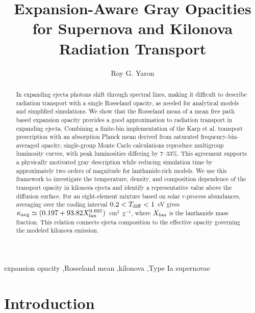 \documentclass[final,5p,times,twocolumn]{elsarticle}
\begin{document}
\begin{frontmatter}

\author[1]{Roy G. Yaron}

\title{Expansion-Aware Gray Opacities for Supernova and Kilonova Radiation Transport}

\begin{abstract}
    In expanding ejecta photons shift through spectral lines, making it difficult to describe radiation transport 
    with a single Rosseland opacity, as needed for analytical models and simplified simulations.
    We show that the Rosseland mean of a mean free path based expansion opacity provides
    a good approximation to radiation transport in expanding ejecta. Combining a finite-bin
    implementation of the Karp et al. transport prescription with an absorption Planck mean
    derived from saturated frequency-bin-averaged opacity, single-group Monte Carlo calculations
    reproduce multigroup luminosity curves, with peak luminosities differing by $7$--$33\%$.
    This agreement supports a physically motivated gray description while reducing simulation
    time by approximately two orders of magnitude for lanthanide-rich models. We use this
    framework to investigate the temperature, density, and composition dependence of the
    transport opacity in kilonova ejecta and identify a representative value above the diffusion
    surface. For an eight-element mixture based on solar $r$-process abundances, averaging over
    the cooling interval $0.2<T_{\rm diff}<1$~eV gives
    $\kappa_{\rm avg}\simeq(0.197+93.82X_{\rm lan}^{0.691})$~cm$^2$~g$^{-1}$,
    where $X_{\rm lan}$ is the lanthanide mass fraction. This relation connects ejecta composition
    to the effective opacity governing the modeled kilonova emission.
    \end{abstract}

\begin{keyword}
    expansion opacity \sep Rosseland mean \sep kilonova \sep Type Ia supernovae
\end{keyword}

\end{frontmatter}


\section{Introduction}
\label{SecIntro}
\end{document}
